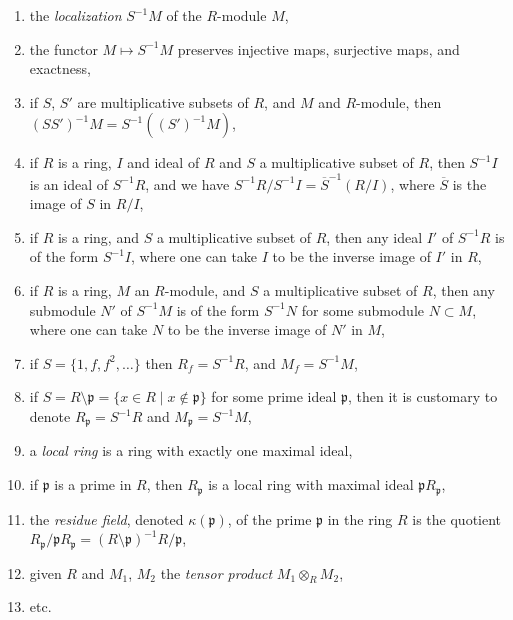 \begin{enumerate}
\label{localization-localization}
\item the {\it localization} $S^{-1}M$ of the $R$-module $M$,
\label{localization-module}
\item the functor $M \mapsto S^{-1}M$ preserves injective maps,
surjective maps, and exactness,
\label{localization-exact}
\item if $S$, $S'$ are multiplicative subsets of $R$,
and $M$ and $R$-module, then $(SS')^{-1}M =
S^{-1}((S')^{-1}M)$,
\label{localization-localization-module}
\item if $R$ is a ring, $I$ and ideal of $R$ and $S$ a multiplicative
subset of $R$, then $S^{-1}I$ is an ideal of $S^{-1}R$, and we have
$S^{-1}R/S^{-1}I = \overline{S}^{-1}(R/I)$, where $\overline{S}$
is the image of $S$ in $R/I$,
\label{localize-ideal}
\item if $R$ is a ring, and $S$ a multiplicative
subset of $R$, then any ideal $I'$ of $S^{-1}R$ is
of the form $S^{-1}I$, where one can take $I$ to be
the inverse image of $I'$ in $R$,
\label{ideal-in-localization}
\item if $R$ is a ring, $M$ an $R$-module, and $S$ a multiplicative
subset of $R$, then any submodule $N'$ of $S^{-1}M$ is of the form
$S^{-1}N$ for some submodule $N \subset M$, where
one can take $N$ to be the inverse image of $N'$ in $M$,
\label{submodule-in-localization}
\item if $S = \{1, f, f^2,\ldots\}$ then $R_f = S^{-1}R$, and
$M_f = S^{-1}M$,
\label{localize-f}
\item if $S = R \setminus \mathfrak p = \{x\in R \mid x\not\in \mathfrak p\}$
for some prime ideal $\mathfrak p$,
then it is customary to denote $R_{\mathfrak p} = S^{-1}R$
and $M_{\mathfrak p} = S^{-1}M$,
\label{localize-p}
\item a {\it local ring} is a ring with exactly one maximal ideal,
\label{local-ring}
\item if $\mathfrak p$ is a prime in $R$, then $R_{\mathfrak p}$ is
a local ring with maximal ideal $\mathfrak p R_{\mathfrak p}$,
\label{localize-p-local-ring}
\item the {\it residue field}, denoted $\kappa(\mathfrak p)$,
of the prime $\mathfrak p$ in the
ring $R$ is the quotient $R_{\mathfrak p}/{\mathfrak p}R_{\mathfrak p}
= (R \setminus \mathfrak p)^{-1}R/{\mathfrak p}$,
\label{residue-field}
\item given $R$ and $M_1$, $M_2$ the {\it tensor product} 
$M_1 \otimes_R M_2$,
\label{tensor-product}
\item etc.
\end{enumerate}





















